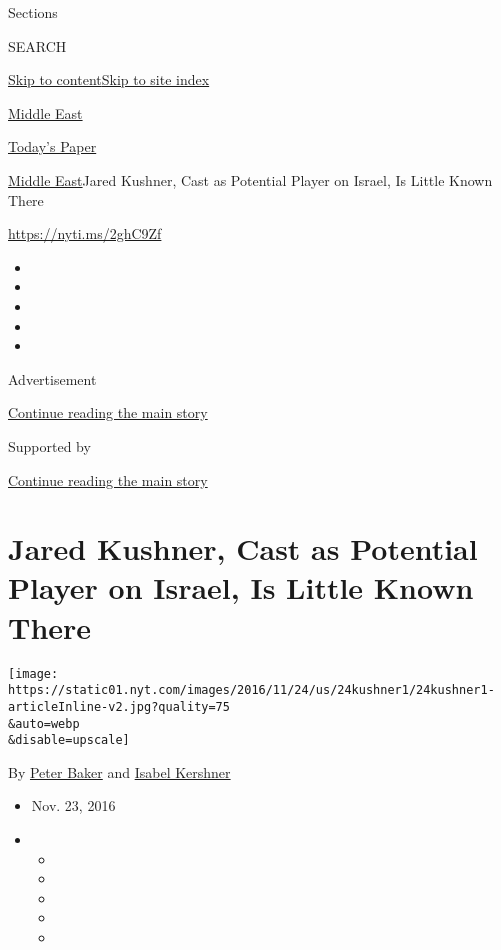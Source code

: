 Sections

SEARCH

\protect\hyperlink{site-content}{Skip to
content}\protect\hyperlink{site-index}{Skip to site index}

\href{https://www.nytimes.com/section/world/middleeast}{Middle East}

\href{https://myaccount.nytimes.com/auth/login?response_type=cookie\&client_id=vi}{}

\href{https://www.nytimes.com/section/todayspaper}{Today's Paper}

\href{/section/world/middleeast}{Middle East}\textbar{}Jared Kushner,
Cast as Potential Player on Israel, Is Little Known There

\url{https://nyti.ms/2ghC9Zf}

\begin{itemize}
\item
\item
\item
\item
\item
\end{itemize}

Advertisement

\protect\hyperlink{after-top}{Continue reading the main story}

Supported by

\protect\hyperlink{after-sponsor}{Continue reading the main story}

\hypertarget{jared-kushner-cast-as-potential-player-on-israel-is-little-known-there}{%
\section{Jared Kushner, Cast as Potential Player on Israel, Is Little
Known
There}\label{jared-kushner-cast-as-potential-player-on-israel-is-little-known-there}}

\texttt{[image: https://static01.nyt.com/images/2016/11/24/us/24kushner1/24kushner1-articleInline-v2.jpg?quality=75\\\&auto=webp\\\&disable=upscale]}

By \href{http://www.nytimes.com/by/peter-baker}{Peter Baker} and
\href{https://www.nytimes.com/by/isabel-kershner}{Isabel Kershner}

\begin{itemize}
\item
  Nov. 23, 2016
\item
  \begin{itemize}
  \item
  \item
  \item
  \item
  \item
  \end{itemize}
\end{itemize}

